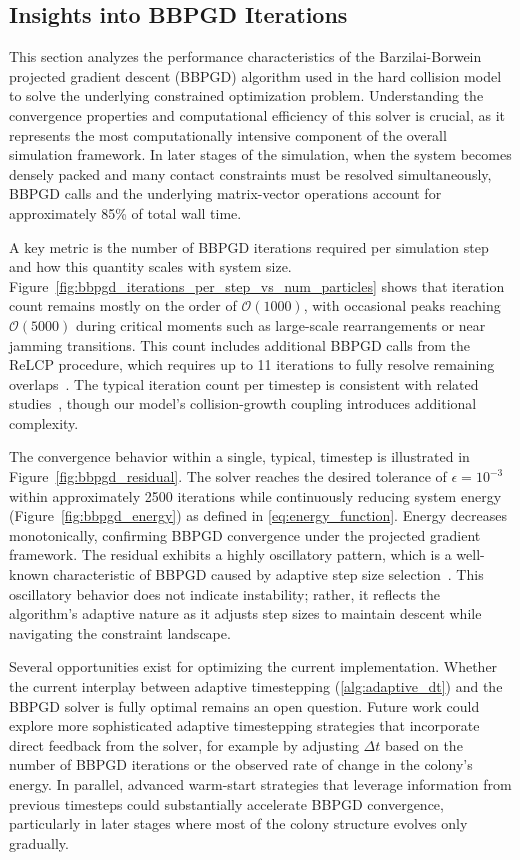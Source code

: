 \documentclass[conference]{IEEEtran}
\begin{document}
\subsection{Insights into BBPGD Iterations}

This section analyzes the performance characteristics of the Barzilai-Borwein projected gradient descent (BBPGD) algorithm used in the hard collision model to solve the underlying constrained optimization problem. Understanding the convergence properties and computational efficiency of this solver is crucial, as it represents the most computationally intensive component of the overall simulation framework. In later stages of the simulation, when the system becomes densely packed and many contact constraints must be resolved simultaneously, BBPGD calls and the underlying matrix-vector operations account for approximately 85\% of total wall time.

A key metric is the number of BBPGD iterations required per simulation step and how this quantity scales with system size. Figure~\ref{fig:bbpgd_iterations_per_step_vs_num_particles} shows that iteration count remains mostly on the order of $\mathcal{O}(1000)$, with occasional peaks reaching $\mathcal{O}(5000)$ during critical moments such as large-scale rearrangements or near jamming transitions. This count includes additional BBPGD calls from the ReLCP procedure, which requires up to 11 iterations to fully resolve remaining overlaps~\cite{Weady2024SM}. The typical iteration count per timestep is consistent with related studies~\cite{Yan2019}, though our model's collision-growth coupling introduces additional complexity.

The convergence behavior within a single, typical, timestep is illustrated in Figure~\ref{fig:bbpgd_residual}. The solver reaches the desired tolerance of $\epsilon = 10^{-3}$ within approximately 2500 iterations while continuously reducing system energy (Figure~\ref{fig:bbpgd_energy}) as defined in \autoref{eq:energy_function}. Energy decreases monotonically, confirming BBPGD convergence under the projected gradient framework. The residual exhibits a highly oscillatory pattern, which is a well-known characteristic of BBPGD caused by adaptive step size selection~\cite{BBPGD,Schneider2021}. This oscillatory behavior does not indicate instability; rather, it reflects the algorithm's adaptive nature as it adjusts step sizes to maintain descent while navigating the constraint landscape.

Several opportunities exist for optimizing the current implementation. Whether the current interplay between adaptive timestepping (\autoref{alg:adaptive_dt}) and the BBPGD solver is fully optimal remains an open question. Future work could explore more sophisticated adaptive timestepping strategies that incorporate direct feedback from the solver, for example by adjusting $\Delta t$ based on the number of BBPGD iterations or the observed rate of change in the colony's energy. In parallel, advanced warm-start strategies that leverage information from previous timesteps could substantially accelerate BBPGD convergence, particularly in later stages where most of the colony structure evolves only gradually.
\end{document}
